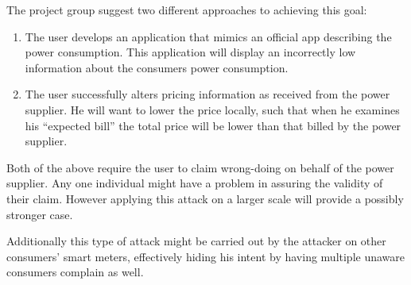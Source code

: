The project group suggest two different approaches to achieving this goal:
\begin{enumerate}
  \item The user develops an application that mimics an official app describing the power consumption.
  This application will display an incorrectly low information about the consumers power consumption.
  \item The user successfully alters pricing information as received from the power supplier.
  He will want to lower the price locally, such that when he examines his ``expected bill'' the total price will be lower than that billed by the power supplier.
\end{enumerate}
Both of the above require the user to claim wrong-doing on behalf of the power supplier.
Any one individual might have a problem in assuring the validity of their claim.
However applying this attack on a larger scale will provide a possibly stronger case.

Additionally this type of attack might be carried out by the attacker on other consumers' smart meters, effectively hiding his intent by having multiple unaware consumers complain as well.
